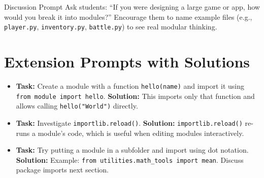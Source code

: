 \documentclass[12pt]{article}
\begin{document}
\begin{teacherbox}{Discussion Prompt}
Ask students: “If you were designing a large game or app, how would you break it into modules?”  
Encourage them to name example files (e.g., \texttt{player.py}, \texttt{inventory.py}, \texttt{battle.py}) to see real modular thinking.
\end{teacherbox}

\section{Extension Prompts with Solutions}

\begin{itemize}
  \item \textbf{Task:} Create a module with a function \texttt{hello(name)} and import it using  
  \texttt{from module import hello}.  
  \textbf{Solution:}  
  This imports only that function and allows calling \texttt{hello("World")} directly.
  
  \item \textbf{Task:} Investigate \texttt{importlib.reload()}.  
  \textbf{Solution:}  
  \texttt{importlib.reload()} re-runs a module’s code, which is useful when editing modules interactively.

  \item \textbf{Task:} Try putting a module in a subfolder and import using dot notation.  
  \textbf{Solution:}  
  Example:  
  \texttt{from utilities.math\_tools import mean}.  
  Discuss package imports next section.
\end{itemize}

\end{document}
